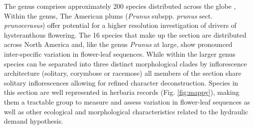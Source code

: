 \documentclass{article}[11pt]
\begin{document}
\noindent The genus  comprises approximately 200 species distributed across the globe \citep{Chin:2014wu}, Within the genus, The American plums (\textit{Prunus} subspp. \textit{prunus} sect. \textit{prunocerasus}) offer potential for a higher resolution investigation of drivers of hysteranthous flowering. The 16 species that make up the section are distributed across North America and, like the genus \textit{Prunus} at large, show pronounced inter-specific variation in flower-leaf sequences. While within the larger genus species can be separated into three distinct morphological clades by inflorescence architecture (solitary, corymbose or racemose) all members of the section share solitary inflorescences \citep{Shaw:2004aa} allowing for  refined character deconstruction. Species in this section are well represented in herbaria records (Fig. \ref{fig:mappy}), making them a tractable group to measure and assess variation in flower-leaf sequences as well as other ecological and morphological characteristics related to the hydraulic demand hypothesis. 

\end{document}
